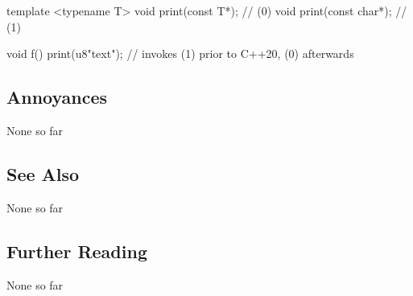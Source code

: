 \begin{emcppslisting}
template <typename T> void print(const T*);  // (0)
void print(const char*);                     // (1)

void f()
{
    print(u8"text");  // invokes (1) prior to C++20, (0) afterwards
}
\end{emcppslisting}
        

\subsection[Annoyances]{Annoyances}\label{annoyances}

None so far

\subsection[See Also]{See Also}\label{see-also}

None so far

\subsection[Further Reading]{Further Reading}\label{further-reading}

None so far

